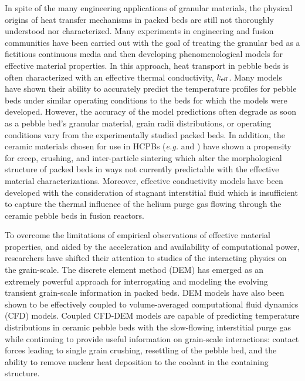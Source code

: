 In spite of the many engineering applications of granular materials, the physical origins of heat transfer mechanisms in packed beds are still not thoroughly understood nor characterized. Many experiments in engineering and fusion communities have been carried out with the goal of treating the granular bed as a fictitious continuous media and then developing phenomenological models for effective material properties. In this approach, heat transport in pebble beds is often characterized with an effective thermal conductivity, $k_\text{eff}$. Many models have shown their ability to accurately predict the temperature profiles for pebble beds under similar operating conditions to the beds for which the models were developed. However, the accuracy of the model predictions often degrade as soon as a pebble bed's granular material, grain radii distributions, or operating conditions vary from the experimentally studied packed beds. In addition, the ceramic materials chosen for use in HCPBs (\textit{e.g.} \lit and \lis) have shown a propensity for creep, crushing, and inter-particle sintering which alter the morphological structure of packed beds in ways not currently predictable with the effective material characterizations. Moreover, effective conductivity models have been developed with the consideration of stagnant interstitial fluid which is insufficient to capture the thermal influence of the helium purge gas flowing through the ceramic pebble beds in fusion reactors.

To overcome the limitations of empirical observations of effective material properties, and aided by the acceleration and availability of computational power, researchers have shifted their attention to studies of the interacting physics on the grain-scale. The discrete element method (DEM) has emerged as an extremely powerful approach for interrogating and modeling the evolving transient grain-scale information in packed beds. DEM models have also been shown to be effectively coupled to volume-averaged computational fluid dynamics (CFD) models. Coupled CFD-DEM models are capable of predicting temperature distributions in ceramic pebble beds with the slow-flowing interstitial purge gas while continuing to provide useful information on grain-scale interactions: contact forces leading to single grain crushing, resettling of the pebble bed, and the ability to remove nuclear heat deposition to the coolant in the containing structure.



